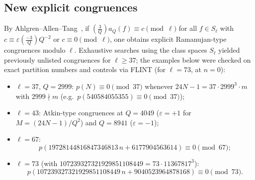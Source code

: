 \documentclass[11pt,reqno]{amsart}
\theoremstyle{definition}
\theoremstyle{remark}
\newcommand{\legendre}[2]{\left(\frac{#1}{#2}\right)}
\begin{document}
\subsection{New explicit congruences}
By Ahlgren--Allen--Tang~\cite[Lemma~5.1]{AAT}, if $\legendre{3}{Q} a_Q(f) \equiv c \pmod{\ell}$ for all $f \in S_\ell$ with $c \equiv \varepsilon \legendre{-3}{Q} Q^{-2}$ or $c \equiv 0 \pmod{\ell}$, one obtains explicit Ramanujan-type congruences modulo $\ell$. Exhaustive searches using the class spaces $S_\ell$ yielded previously unlisted congruences for $\ell \ge 37$; the examples below were checked on exact partition numbers and controls via FLINT (for $\ell = 73$, at $n = 0$):
\begin{itemize}
  \item $\ell = 37$, $Q = 2999$: $p(N) \equiv 0 \pmod{37}$ whenever $24N - 1 = 37 \cdot 2999^3 \cdot m$ with $2999 \nmid m$ (e.g.\ $p(540584055355) \equiv 0 \pmod{37}$);
  \item $\ell = 43$: Atkin-type congruences at $Q = 4049$ ($\varepsilon = +1$ for $M = (24N-1)/Q^2$) and $Q = 8941$ ($\varepsilon = -1$);
  \item $\ell = 67$:
  \[
    p(19728144816847346813\,n + 6177904563614) \equiv 0 \pmod{67};
  \]
  \item $\ell = 73$ (with $107239327321929851108449 = 73 \cdot 11367817^3$):
  \[
    p(107239327321929851108449\,n + 9040523964878168) \equiv 0 \pmod{73}.
  \]
\end{itemize}
\end{document}
